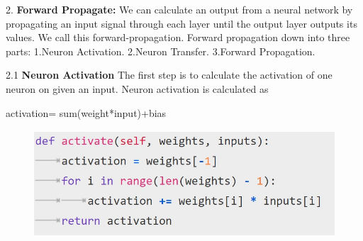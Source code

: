 2. \textbf{Forward Propagate:}
We can calculate an output from a neural network by propagating an input signal through each layer until the output layer outputs its values.
We call this forward-propagation.\newline
Forward propagation down into three parts:\newline
    1.Neuron Activation.\newline
    2.Neuron Transfer.\newline
    3.Forward Propagation.\newline
    
2.1 \textbf{Neuron Activation}
The first step is to calculate the activation of one neuron on given an input.\newline
Neuron activation is calculated as\newline
           \centerline{activation= sum(weight*input)+bias }

\begin{figure}[H]
\begin{center}
\includegraphics[width=120mm,height=40mm]{backexplain/activate.jpg}
\end{center}
     
\end{figure}            
            


